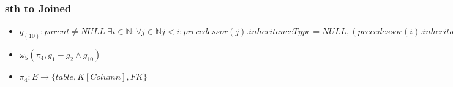 \documentclass[11pt,a4paper]{article}   	%
\begin{document}
			
			

		\subsubsection{sth to Joined}
			\begin{itemize}
			  	\item	$g_(10) : parent \neq NULL \;\exists i \in \mathbb{N} : \forall j
			  			\in \mathbb{N} j < i : precedessor(j).inheritanceType = NULL, (
						precedessor(i).inheritanceType = TablePerClass \vee precedessor(i).inheritanceType
						= Joined), self.inheritanceType = SingleTable $
			  	\item 	$\omega_5 (\pi_4, g_1 - g_2 \wedge g_10) $
			  	\item 	$\pi_4 : E \to \{ table, K[Column], FK\}$
			\end{itemize}
\end{document}
